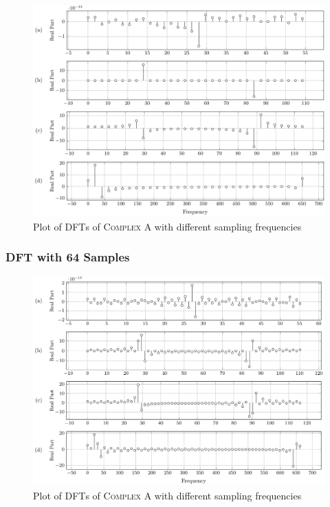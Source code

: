 \documentclass[../../course]{subfiles}
\begin{document}
\vfill

\begin{figure} [H]
    \centering
     {
        \includegraphics[height = 0.8\textheight] {tikzpics/plotDftComplexA32.pdf}
    }
     {Plot of \textsc{DFT}s of \textsc{Complex A} with different sampling frequencies}
    \label{plt:dftComplexA}
\end{figure}

\subsubsection{DFT with 64 Samples}

\vfill

\begin{figure} [H]
    \centering
     {
        \includegraphics[height = 0.8\textheight] {tikzpics/plotDftComplexA64.pdf}
    }
     {Plot of \textsc{DFT}s of \textsc{Complex A} with different sampling frequencies}
    \label{plt:dftComplexA}
\end{figure}
\end{document}
